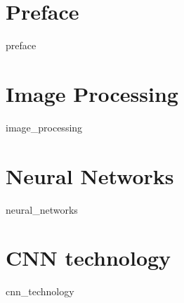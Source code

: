 \section{Preface}
{preface}

\section{Image Processing}
{image_processing}

\section{Neural Networks}
{neural_networks}

\section{CNN technology}
{cnn_technology}